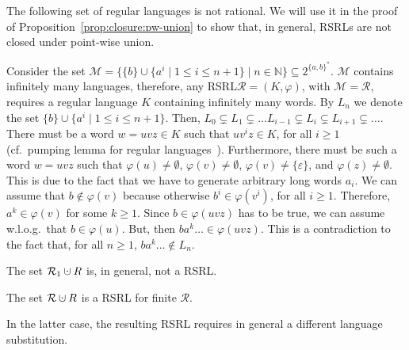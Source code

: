 \documentclass[envcountsame]{llncs}
\newcommand{\rationalset}{\ensuremath{\mathcal{R}}\xspace}
\newcommand{\cR}{\ensuremath{\mathcal{R}}\xspace}
\newcommand{\bN}{\ensuremath{\mathbb{N}}\xspace}
\newcommand{\cM}{\ensuremath{\mathcal{M}}\xspace}
\newcommand{\dotcup}{\:\ensuremath{\mathaccent\cdot\cup}\:}
\newcommand{\RegularlyGeneratedLanguageSetAbbrev}{RSRL\xspace}
\newcommand{\RegularlyGeneratedLanguageSetsAbbrev}{RSRLs\xspace}
\newcommand{\ARegularlyGeneratedLanguageSet}{rational\xspace}
\begin{document}
The following set of regular languages is not \ARegularlyGeneratedLanguageSet.
We will use it in the proof of Proposition~\ref{prop:closure:pw-union} to show that, in general, \RegularlyGeneratedLanguageSetsAbbrev are not closed under point-wise union.
\begin{example}
	\label{expl:pumping-lemma}
Consider the set $\cM = \{ \{ b \} \cup \{ a^{i} \mid 1 \leq i \leq n + 1 \} \mid n \in \bN \} \subseteq 2^{\{a, b\}^*}$.
	$\cM$ contains infinitely many languages, therefore, any \RegularlyGeneratedLanguageSetAbbrev $\rationalset = (K, \varphi)$, with $\cM = \cR$, requires a regular language $K$ containing infinitely many words.
	By $L_n$ we denote the set $\{b\} \cup \{ a^i \mid 1 \leq i \leq n + 1\}$.
	Then, $L_0 \subsetneq L_1 \subsetneq \ldots L_{i - 1} \subsetneq L_i \subsetneq L_{i + 1} \subsetneq \ldots$.
	There must be a word $w = uvz \in K$ such that $uv^iz\in K$, for all $i \geq
  1$ (cf.~pumping lemma for regular languages~\cite{DBLP:books/aw/HopcroftU79}).
	Furthermore, there must be such a word $w = uvz$ such that $\varphi(u) \neq \emptyset$, $\varphi(v) \neq \emptyset$, $\varphi(v) \neq \{ \varepsilon \}$, and $\varphi(z) \neq \emptyset$.
	This is due to the fact that we have to generate arbitrary long words $a_i$.
	We can assume that $b \notin \varphi(v)$ because otherwise $b^i \in \varphi(v^i)$, for all $i \geq 1$.
	Therefore, $a^k \in \varphi(v)$ for some $k \geq 1$.
	Since $b \in \varphi(uvz)$ has to be true, we can assume w.l.o.g.~that $b \in \varphi(u)$.
	But, then $ba^k\ldots \in \varphi(uvz)$.
	This is a contradiction to the fact that, for all $n \geq 1$, $ba^k\ldots \notin L_n$.
\end{example}


\begin{proposition}
  \label{prop:closure:pw-union}
  \begin{inparaenum}
  \item\label{prop:closure:pw-union:a} The set $\rationalset_1 \dotcup
    R$ is, in general, not a \RegularlyGeneratedLanguageSetAbbrev.
  \item\label{prop:closure:pw-union:b} The set $\rationalset \dotcup
    R$ is a \RegularlyGeneratedLanguageSetAbbrev for finite $\rationalset$.
  \item\label{prop:closure:pw-union:c} In the latter case, the
    resulting \RegularlyGeneratedLanguageSetAbbrev requires in general a different language
    substitution.
  \end{inparaenum}
\end{proposition}
\end{document}
